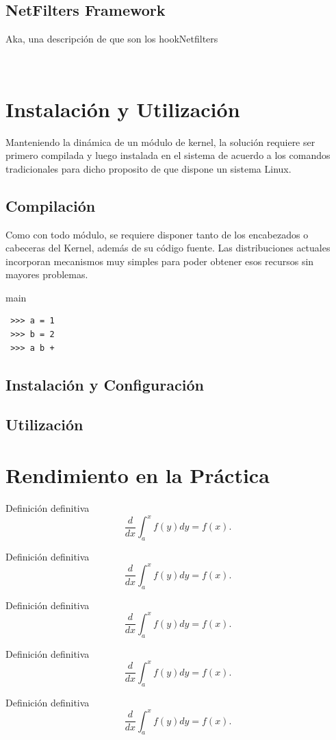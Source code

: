\subsection{NetFilters Framework}
Aka, una descripción de que son los hookNetfilters

\

\section{Instalación y Utilización}
Manteniendo la dinámica de un módulo de kernel, la solución requiere ser primero compilada y luego instalada en el sistema de acuerdo a los comandos tradicionales para dicho proposito de que dispone un sistema Linux.

\subsection{Compilación}
Como con todo módulo, se requiere disponer tanto de los encabezados o cabeceras del Kernel, además de su código fuente. Las distribuciones actuales incorporan mecanismos muy simples para poder obtener esos recursos sin mayores problemas.

\begin{listing}
\caption{main}
\begin{verbatim}
 >>> a = 1 
 >>> b = 2
 >>> a b +
\end{verbatim}
\end{listing}


\subsection{Instalación y Configuración}
\subsection{Utilización}

\section{Rendimiento en la Práctica}

\begin{defn} Definición definitiva $$\frac{d}{dx}\int_a^xf(y)dy=f(x).$$\end{defn}

\begin{teo} Definición definitiva $$\frac{d}{dx}\int_a^xf(y)dy=f(x).$$\end{teo}

\begin{prop} Definición definitiva $$\frac{d}{dx}\int_a^xf(y)dy=f(x).$$\end{prop}

\begin{obs} Definición definitiva $$\frac{d}{dx}\int_a^xf(y)dy=f(x).$$\end{obs}

\begin{ej} Definición definitiva $$\frac{d}{dx}\int_a^xf(y)dy=f(x).$$\end{ej}